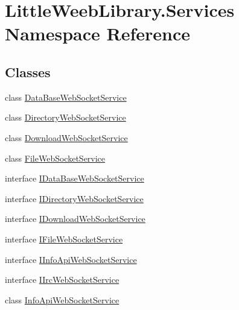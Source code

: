 \hypertarget{namespace_little_weeb_library_1_1_services}{}\section{Little\+Weeb\+Library.\+Services Namespace Reference}
\label{namespace_little_weeb_library_1_1_services}
\subsection*{Classes}
\begin{DoxyCompactItemize}
\item 
class \mbox{\hyperlink{class_little_weeb_library_1_1_services_1_1_data_base_web_socket_service}{Data\+Base\+Web\+Socket\+Service}}
\item 
class \mbox{\hyperlink{class_little_weeb_library_1_1_services_1_1_directory_web_socket_service}{Directory\+Web\+Socket\+Service}}
\item 
class \mbox{\hyperlink{class_little_weeb_library_1_1_services_1_1_download_web_socket_service}{Download\+Web\+Socket\+Service}}
\item 
class \mbox{\hyperlink{class_little_weeb_library_1_1_services_1_1_file_web_socket_service}{File\+Web\+Socket\+Service}}
\item 
interface \mbox{\hyperlink{interface_little_weeb_library_1_1_services_1_1_i_data_base_web_socket_service}{I\+Data\+Base\+Web\+Socket\+Service}}
\item 
interface \mbox{\hyperlink{interface_little_weeb_library_1_1_services_1_1_i_directory_web_socket_service}{I\+Directory\+Web\+Socket\+Service}}
\item 
interface \mbox{\hyperlink{interface_little_weeb_library_1_1_services_1_1_i_download_web_socket_service}{I\+Download\+Web\+Socket\+Service}}
\item 
interface \mbox{\hyperlink{interface_little_weeb_library_1_1_services_1_1_i_file_web_socket_service}{I\+File\+Web\+Socket\+Service}}
\item 
interface \mbox{\hyperlink{interface_little_weeb_library_1_1_services_1_1_i_info_api_web_socket_service}{I\+Info\+Api\+Web\+Socket\+Service}}
\item 
interface \mbox{\hyperlink{interface_little_weeb_library_1_1_services_1_1_i_irc_web_socket_service}{I\+Irc\+Web\+Socket\+Service}}
\item 
class \mbox{\hyperlink{class_little_weeb_library_1_1_services_1_1_info_api_web_socket_service}{Info\+Api\+Web\+Socket\+Service}}

\end{DoxyCompactItemize}
